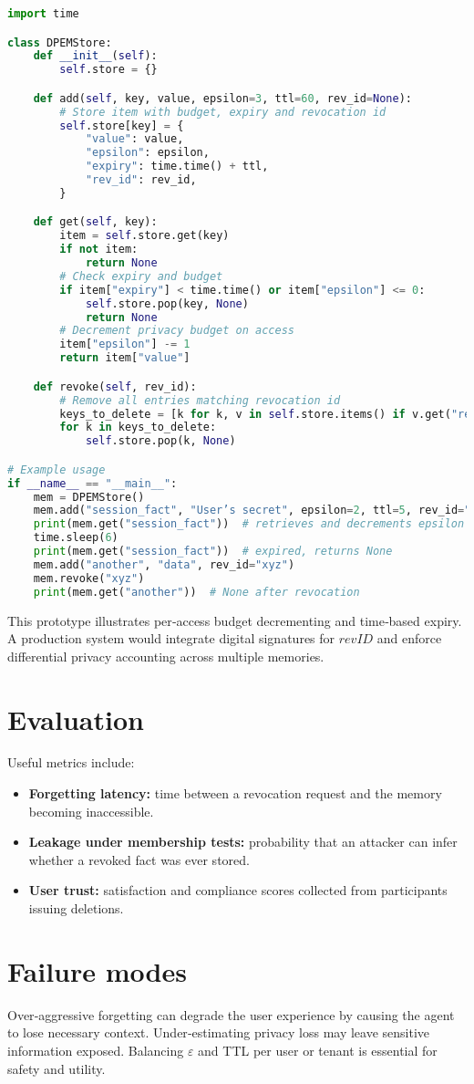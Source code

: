\documentclass{article}
\begin{document}
\begin{lstlisting}[language=Python, caption={Prototype of a DPEM store.}, label={lst:dpem}]
import time

class DPEMStore:
    def __init__(self):
        self.store = {}

    def add(self, key, value, epsilon=3, ttl=60, rev_id=None):
        # Store item with budget, expiry and revocation id
        self.store[key] = {
            "value": value,
            "epsilon": epsilon,
            "expiry": time.time() + ttl,
            "rev_id": rev_id,
        }

    def get(self, key):
        item = self.store.get(key)
        if not item:
            return None
        # Check expiry and budget
        if item["expiry"] < time.time() or item["epsilon"] <= 0:
            self.store.pop(key, None)
            return None
        # Decrement privacy budget on access
        item["epsilon"] -= 1
        return item["value"]

    def revoke(self, rev_id):
        # Remove all entries matching revocation id
        keys_to_delete = [k for k, v in self.store.items() if v.get("rev_id") == rev_id]
        for k in keys_to_delete:
            self.store.pop(k, None)

# Example usage
if __name__ == "__main__":
    mem = DPEMStore()
    mem.add("session_fact", "User’s secret", epsilon=2, ttl=5, rev_id="abc123")
    print(mem.get("session_fact"))  # retrieves and decrements epsilon
    time.sleep(6)
    print(mem.get("session_fact"))  # expired, returns None
    mem.add("another", "data", rev_id="xyz")
    mem.revoke("xyz")
    print(mem.get("another"))  # None after revocation
\end{lstlisting}

This prototype illustrates per‑access budget decrementing and time‑based expiry.  A production system would integrate digital signatures for $\mathit{revID}$ and enforce differential privacy accounting across multiple memories.

\section{Evaluation}
Useful metrics include:
\begin{itemize}
  \item \textbf{Forgetting latency:} time between a revocation request and the memory becoming inaccessible.
  \item \textbf{Leakage under membership tests:} probability that an attacker can infer whether a revoked fact was ever stored.
  \item \textbf{User trust:} satisfaction and compliance scores collected from participants issuing deletions.
\end{itemize}

\section{Failure modes}
Over‑aggressive forgetting can degrade the user experience by causing the agent to lose necessary context.  Under‑estimating privacy loss may leave sensitive information exposed.  Balancing $\varepsilon$ and TTL per user or tenant is essential for safety and utility.
\end{document}
